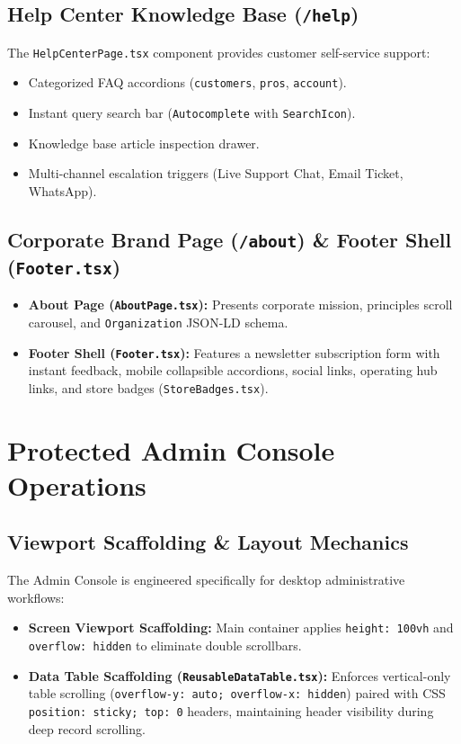 \documentclass[11pt,a4paper]{article}
\begin{document}
\subsection{Help Center Knowledge Base (\texttt{/help})}
The \texttt{HelpCenterPage.tsx} component provides customer self-service support:
\begin{itemize}
    \item Categorized FAQ accordions (\texttt{customers}, \texttt{pros}, \texttt{account}).
    \item Instant query search bar (\texttt{Autocomplete} with \texttt{SearchIcon}).
    \item Knowledge base article inspection drawer.
    \item Multi-channel escalation triggers (Live Support Chat, Email Ticket, WhatsApp).
\end{itemize}

\subsection{Corporate Brand Page (\texttt{/about}) \& Footer Shell (\texttt{Footer.tsx})}
\begin{itemize}
    \item \textbf{About Page (\texttt{AboutPage.tsx}):} Presents corporate mission, principles scroll carousel, and \texttt{Organization} JSON-LD schema.
    \item \textbf{Footer Shell (\texttt{Footer.tsx}):} Features a newsletter subscription form with instant feedback, mobile collapsible accordions, social links, operating hub links, and store badges (\texttt{StoreBadges.tsx}).
\end{itemize}

\newpage

\section{Protected Admin Console Operations}

\subsection{Viewport Scaffolding \& Layout Mechanics}
The Admin Console is engineered specifically for desktop administrative workflows:
\begin{itemize}
    \item \textbf{Screen Viewport Scaffolding:} Main container applies \texttt{height: 100vh} and \texttt{overflow: hidden} to eliminate double scrollbars.
    \item \textbf{Data Table Scaffolding (\texttt{ReusableDataTable.tsx}):} Enforces vertical-only table scrolling (\texttt{overflow-y: auto; overflow-x: hidden}) paired with CSS \texttt{position: sticky; top: 0} headers, maintaining header visibility during deep record scrolling.
\end{itemize}
\end{document}

